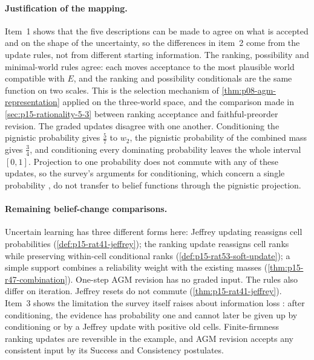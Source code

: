 \paragraph{Justification of the mapping.}
Item~1 shows that the five descriptions can be made to agree on what is
accepted and on the shape of the uncertainty, so the differences in item~2
come from the update rules, not from different starting information. The
ranking, possibility and minimal-world rules agree: each moves acceptance
to the most plausible world compatible with \(E\), and the ranking and
possibility conditionals are the same function on two scales. This is the
selection mechanism of \cref{thm:p08-agm-representation} applied on the
three-world space, and the comparison made in \cref{sec:p15-rationality-5-3}
between ranking acceptance and faithful-preorder revision. The graded
updates disagree with one another. Conditioning the pignistic probability
gives \(\tfrac57\) to \(w_2\), the pignistic probability of the combined
mass gives \(\tfrac34\), and conditioning every dominating probability
leaves the whole interval \([0,1]\). Projection to one probability does
not commute with any of these updates, so the survey's arguments for
conditioning, which concern a single probability
\cite[p.~244]{HajekStaffel2021Dynamics}, do not transfer to belief
functions through the pignistic projection.

\paragraph{Remaining belief-change comparisons.}
Uncertain learning has three different forms here: Jeffrey updating
reassigns cell probabilities (\cref{def:p15-rat41-jeffrey}); the ranking
update reassigns cell ranks while preserving within-cell conditional ranks
(\cref{def:p15-rat53-soft-update}); a simple support combines a reliability
weight with the existing masses (\cref{thm:p15-r47-combination}). One-step
AGM revision has no graded input. The rules also differ on iteration.
Jeffrey resets do not commute (\cref{thm:p15-rat41-jeffrey}). Item~3 shows
the limitation the survey itself raises about information loss
\cite[p.~246]{HajekStaffel2021Dynamics}: after conditioning, the evidence
has probability one and cannot later be given up by conditioning or by a
Jeffrey update with positive old cells. Finite-firmness ranking updates
are reversible in the example, and AGM revision accepts any consistent
input by its Success and Consistency postulates.

